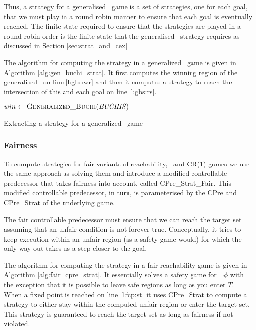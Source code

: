Thus, a strategy for a generalised \buchi\ game is a set of strategies, one for each goal, that we must play in a round robin manner to ensure that each goal is eventually reached. The finite state required to ensure that the strategies are played in a round robin order is the finite state that the generalised \buchi\ strategy requires as discussed in Section \ref{sec:strat_and_cex}.

The algorithm for computing the strategy in a generalized \buchi\ game is given in Algorithm \ref{alg:gen_buchi_strat}. It first computes the winning region of the generalised \buchi\ on line \ref{l:gbs:wr} and then it computes a strategy to reach the intersection of this and each goal on line \ref{l:gbs:rs}.

\begin{algorithm}
\begin{algorithmic}[1]

\State $win \gets \Call{Generalized\_Buchi}{\genbuchiobj}$ \label{l:gbs:wr}
        \State \Return {} \label{l:gbs:rs}
    \EndFor
\EndFunction

\end{algorithmic}
\caption{Extracting a strategy for a generalized \buchi\ game}
\label{alg:gen_buchi_strat}
\end{algorithm}

\subsubsection{Fairness}

To compute strategies for fair variants of reachability, \buchi\ and GR(1) games we use the same approach as solving them and introduce a modified controllable predecessor that takes fairness into account, called CPre\_Strat\_Fair. This modified controllable predecessor, in turn, is parameterised by the CPre and CPre\_Strat of the underlying game.

The fair controllable predecessor must ensure that we can reach the target set assuming that an unfair condition is not forever true. Conceptually, it tries to keep execution within an unfair region (as a safety game would) for which the only way out takes us a step closer to the goal. 

The algorithm for computing the strategy in a fair reachability game is given in Algorithm \ref{alg:fair_cpre_strat}. It essentially solves a safety game for $\neg\phi$ with the exception that it is possible to leave safe regions as long as you enter $T$. When a fixed point is reached on line \ref{l:fcp:st} it uses CPre\_Strat to compute a strategy to either stay within the computed unfair region or enter the target set. This strategy is guaranteed to reach the target set as long as fairness if not violated.

